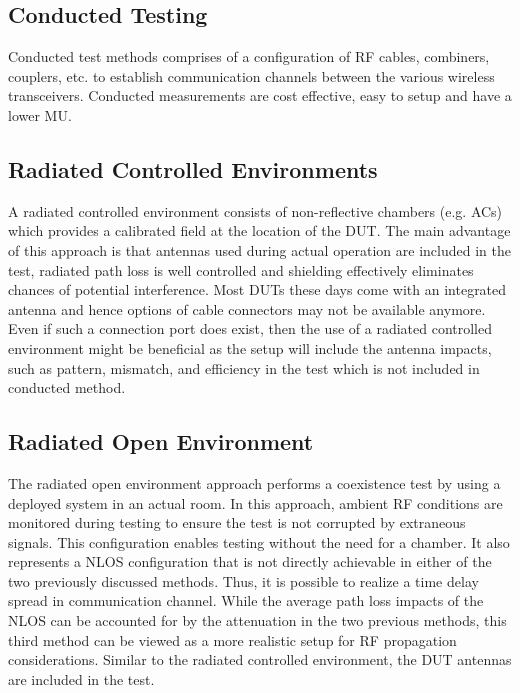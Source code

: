 \subsection{Conducted Testing}
Conducted test methods comprises of a configuration of \acs{RF} cables, combiners, couplers, etc. to establish communication channels between the various wireless transceivers. Conducted measurements are cost effective, easy to setup and have a lower \acf{MU}.

\subsection{Radiated Controlled Environments}
A radiated controlled environment consists of non-reflective chambers (e.g. \acsp{AC}) which provides a calibrated field at the location of the \acs{DUT}. The main advantage of this approach is that antennas used during actual operation are included in the test, radiated path loss is well controlled and shielding effectively eliminates chances of potential interference. Most \acsp{DUT} these days come with an integrated antenna and hence options of cable connectors may not be available anymore. Even if such a connection port does exist, then the use of a radiated controlled environment might be beneficial as the setup will include the antenna impacts, such as pattern, mismatch, and efficiency in the test which is not included in conducted method.

\subsection{Radiated Open Environment}
The radiated open environment approach performs a coexistence test by using a deployed system in an actual room. In this approach, ambient \acs{RF} conditions are monitored during testing to ensure the test is not corrupted by extraneous signals. This configuration enables testing without the need for a chamber. It also represents a \acf{NLOS} configuration that is not directly achievable in either of the two previously discussed methods. Thus, it is possible to realize a time delay spread in communication channel. While the average path loss impacts of the \acs{NLOS} can be accounted for by the attenuation in the two previous methods, this third method can be viewed as a more realistic setup for \acs{RF} propagation considerations. Similar to the radiated controlled environment, the \acs{DUT} antennas are included in the test. 

 

